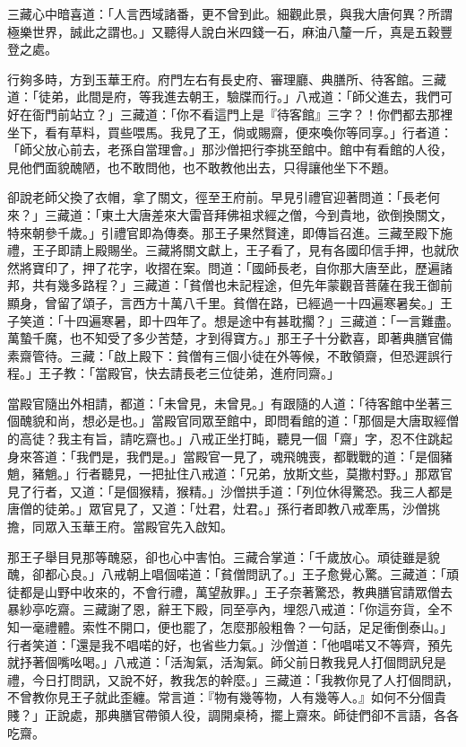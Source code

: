 三藏心中暗喜道：「人言西域諸番，更不曾到此。細觀此景，與我大唐何異？所謂極樂世界，誠此之謂也。」又聽得人說白米四錢一石，麻油八釐一斤，真是五穀豐登之處。

行夠多時，方到玉華王府。府門左右有長史府、審理廳、典膳所、待客館。三藏道：「徒弟，此間是府，等我進去朝王，驗牒而行。」八戒道：「師父進去，我們可好在衙門前站立？」三藏道：「你不看這門上是『待客館』三字？！你們都去那裡坐下，看有草料，買些喂馬。我見了王，倘或賜齋，便來喚你等同享。」行者道：「師父放心前去，老孫自當理會。」那沙僧把行李挑至館中。館中有看館的人役，見他們面貌醜陋，也不敢問他，也不敢教他出去，只得讓他坐下不題。

卻說老師父換了衣帽，拿了關文，徑至王府前。早見引禮官迎著問道：「長老何來？」三藏道：「東土大唐差來大雷音拜佛祖求經之僧，今到貴地，欲倒換關文，特來朝參千歲。」引禮官即為傳奏。那王子果然賢達，即傳旨召進。三藏至殿下施禮，王子即請上殿賜坐。三藏將關文獻上，王子看了，見有各國印信手押，也就欣然將寶印了，押了花字，收摺在案。問道：「國師長老，自你那大唐至此，歷遍諸邦，共有幾多路程？」三藏道：「貧僧也未記程途，但先年蒙觀音菩薩在我王御前顯身，曾留了頌子，言西方十萬八千里。貧僧在路，已經過一十四遍寒暑矣。」王子笑道：「十四遍寒暑，即十四年了。想是途中有甚耽擱？」三藏道：「一言難盡。萬蟄千魔，也不知受了多少苦楚，才到得寶方。」那王子十分歡喜，即著典膳官備素齋管待。三藏：「啟上殿下：貧僧有三個小徒在外等候，不敢領齋，但恐遲誤行程。」王子教：「當殿官，快去請長老三位徒弟，進府同齋。」

當殿官隨出外相請，都道：「未曾見，未曾見。」有跟隨的人道：「待客館中坐著三個醜貌和尚，想必是也。」當殿官同眾至館中，即問看館的道：「那個是大唐取經僧的高徒？我主有旨，請吃齋也。」八戒正坐打盹，聽見一個「齋」字，忍不住跳起身來答道：「我們是，我們是。」當殿官一見了，魂飛魄喪，都戰戰的道：「是個豬魈，豬魈。」行者聽見，一把扯住八戒道：「兄弟，放斯文些，莫撒村野。」那眾官見了行者，又道：「是個猴精，猴精。」沙僧拱手道：「列位休得驚恐。我三人都是唐僧的徒弟。」眾官見了，又道：「灶君，灶君。」孫行者即教八戒牽馬，沙僧挑擔，同眾入玉華王府。當殿官先入啟知。

那王子舉目見那等醜惡，卻也心中害怕。三藏合掌道：「千歲放心。頑徒雖是貌醜，卻都心良。」八戒朝上唱個喏道：「貧僧問訊了。」王子愈覺心驚。三藏道：「頑徒都是山野中收來的，不會行禮，萬望赦罪。」王子奈著驚恐，教典膳官請眾僧去暴紗亭吃齋。三藏謝了恩，辭王下殿，同至亭內，埋怨八戒道：「你這夯貨，全不知一毫禮體。索性不開口，便也罷了，怎麼那般粗魯？一句話，足足衝倒泰山。」行者笑道：「還是我不唱喏的好，也省些力氣。」沙僧道：「他唱喏又不等齊，預先就抒著個嘴吆喝。」八戒道：「活淘氣，活淘氣。師父前日教我見人打個問訊兒是禮，今日打問訊，又說不好，教我怎的幹麼。」三藏道：「我教你見了人打個問訊，不曾教你見王子就此歪纏。常言道：『物有幾等物，人有幾等人。』如何不分個貴賤？」正說處，那典膳官帶領人役，調開桌椅，擺上齋來。師徒們卻不言語，各各吃齋。

